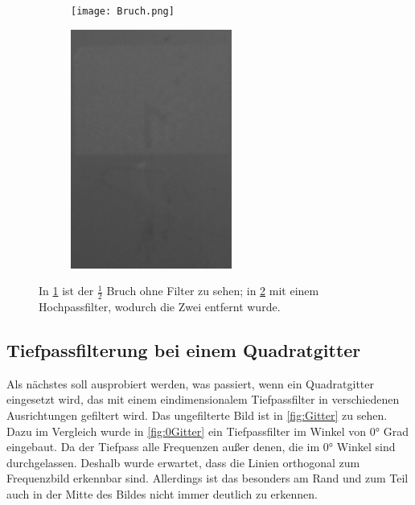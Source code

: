 \begin{figure}[h]
	\begin{subfigure}[c]{0.5\textwidth}
		
		\texttt{[image: Bruch.png]}
		\caption{}
		\label{fig:Bruch}
		
	\end{subfigure}
	\begin{subfigure}[c]{0.5\textwidth}
		\includegraphics[width=0.58\textwidth]{Filter_Bruch.png}
		\caption{}
		\label{fig:Bruch_filter}
	\end{subfigure}
	\caption{In \cref{fig:Bruch} ist der $\frac{1}{2}$ Bruch ohne Filter zu sehen; in \cref{fig:Bruch_filter} mit einem Hochpassfilter, wodurch die Zwei entfernt wurde.}
	\label{Bruch}
\end{figure}   

\subsection{Tiefpassfilterung bei einem Quadratgitter}
Als nächstes soll ausprobiert werden, was passiert, wenn ein Quadratgitter eingesetzt wird, das mit einem eindimensionalem Tiefpassfilter in verschiedenen Ausrichtungen gefiltert wird. Das ungefilterte Bild ist in \cref{fig:Gitter} zu sehen. Dazu im Vergleich wurde in \cref{fig:0Gitter} ein Tiefpassfilter im Winkel von 0° Grad eingebaut. Da der Tiefpass alle Frequenzen außer denen, die im 0° Winkel sind durchgelassen. Deshalb wurde erwartet, dass die Linien orthogonal zum Frequenzbild erkennbar sind. Allerdings ist das besonders am Rand und zum Teil auch in der Mitte des Bildes nicht immer deutlich zu erkennen. 

